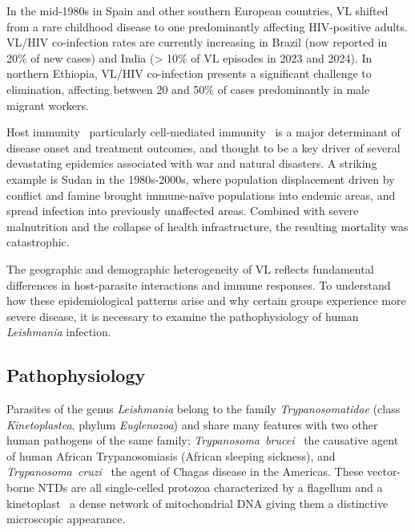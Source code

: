  In the mid-1980s in Spain and other southern European countries, VL shifted from a rare childhood disease to one predominantly affecting HIV-positive adults\cite{monge2014,alvar2008}. VL/HIV co-infection rates are currently increasing in Brazil (now reported in 20\% of new cases\cite{PAHO_Leishmaniasis_2024}) and India (> 10\% of VL episodes in 2023 and 2024\cite{NCVBDC2025}). In northern Ethiopia, VL/HIV co-infection presents a significant challenge to elimination, affecting between 20 and 50\% of cases predominantly in male migrant workers\cite{diro2014}.

Host immunity \textemdash\  particularly cell-mediated immunity \textemdash\  is a major determinant of disease onset and treatment outcomes, and thought to be a key driver of several devastating epidemics associated with war and natural disasters. A striking example is Sudan in the 1980s-2000s, where population displacement driven by conflict and famine brought immune-naïve populations into endemic areas, and spread infection into previously unaffected areas. Combined with severe malnutrition and the collapse of health infrastructure, the resulting mortality was catastrophic\cite{zijlstra1991, collin2004, al-salem2016}.

The geographic and demographic heterogeneity of VL reflects fundamental differences in host-parasite interactions and immune responses. To understand how these epidemiological patterns arise and why certain groups experience more severe disease, it is necessary to examine the pathophysiology of human \textit{Leishmania} infection.

\subsection{Pathophysiology}

Parasites of the genus \textit{Leishmania} belong to the family \textit{Trypanosomatidae} (class \textit{Kinetoplastea}, phylum \textit{Euglenozoa}) and share many features with two other human pathogens of the same family; \textit{Trypanosoma~brucei} \textemdash\ the causative agent of human African Trypanosomiasis (African sleeping sickness), and \textit{Trypanosoma~cruzi} \textemdash\  the agent of Chagas disease in the Americas. These vector-borne NTDs are all single-celled protozoa characterized by a flagellum and a kinetoplast \textemdash\  a dense network of mitochondrial DNA giving them a distinctive microscopic appearance.

